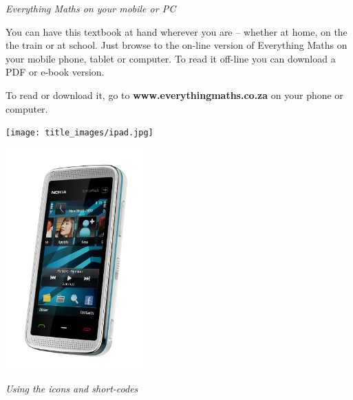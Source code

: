 \newpage
\thispagestyle{empty}

{\normalfont\sffamily\fontsize{22}\normalfont\itshape Everything Maths on your mobile or PC} \par

{\Large
You can have this textbook at hand wherever you are – whether at home, on the the train or at school.
Just browse to the on-line version of Everything Maths on your mobile phone, tablet or computer. To
read it off-line you can download a PDF or e-book version.\par


To read or download it, go to \textbf{www.everythingmaths.co.za} on your phone or computer.} \vspace*{2cm}


\begin{center}
\begin{minipage}{0.4\textwidth}
\centering
\texttt{[image: title\_images/ipad.jpg]}
\end{minipage}
\begin{minipage}{0.4\textwidth}
\centering
\includegraphics[width=0.4\textwidth]{title_images/phone.png}
\end{minipage}
\end{center}

\vspace*{2cm}


{\normalfont\sffamily\fontsize{22}\normalfont\itshape Using the icons and short-codes} \par

